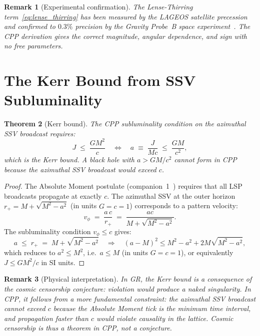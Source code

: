 \documentclass[12pt]{article}
\newtheorem{theorem}{Theorem}[section]
\newtheorem{remark}[theorem]{Remark}
\newcommand{\rplus}{r_+}
\begin{document}
\begin{remark}[Experimental confirmation]
The Lense-Thirring term~\eqref{eq:lense_thirring} has been measured
by the LAGEOS satellite precession~\cite{ciufolini1995} and confirmed
to $0.3\%$ precision by the Gravity Probe~B space
experiment~\cite{everitt2011}.  The CPP derivation gives the correct
magnitude, angular dependence, and sign with no free parameters.
\end{remark}

\section{The Kerr Bound from SSV Subluminality}
\label{sec:kerr_bound}

\begin{theorem}[Kerr bound]
\label{thm:kerr_bound}
The CPP subluminality condition on the azimuthal SSV broadcast requires:
\begin{equation}
  J \;\leq\; \frac{GM^2}{c}
  \quad\Longleftrightarrow\quad
  a \;\equiv\; \frac{J}{Mc} \;\leq\; \frac{GM}{c^2},
  \label{eq:kerr_bound}
\end{equation}
which is the Kerr bound.  A black hole with $a > GM/c^2$ cannot form
in CPP because the azimuthal SSV broadcast would exceed $c$.
\end{theorem}

\begin{proof}
The Absolute Moment postulate (companion~1~\cite{c1}) requires that all
LSP broadcasts propagate at exactly $c$.  The azimuthal SSV at the
outer horizon $\rplus = M + \sqrt{M^2 - a^2}$ (in units $G=c=1$)
corresponds to a pattern velocity:
\begin{equation}
  v_\phi \;=\; \frac{a\,c}{\rplus}
  \;=\; \frac{ac}{M + \sqrt{M^2-a^2}}.
  \label{eq:v_phi}
\end{equation}
The subluminality condition $v_\phi \leq c$ gives:
\begin{equation}
  a \;\leq\; \rplus \;=\; M + \sqrt{M^2-a^2}
  \quad\Longrightarrow\quad
  (a-M)^2 \leq M^2 - a^2 + 2M\sqrt{M^2-a^2},
\end{equation}
which reduces to $a^2 \leq M^2$, i.e.\ $a \leq M$ (in units $G=c=1$),
or equivalently $J \leq GM^2/c$ in SI units.
\end{proof}

\begin{remark}[Physical interpretation]
In GR, the Kerr bound is a consequence of the cosmic censorship
conjecture: violation would produce a naked singularity.  In CPP,
it follows from a more fundamental constraint: the azimuthal SSV
broadcast cannot exceed $c$ because the Absolute Moment tick is the
minimum time interval, and propagation faster than $c$ would violate
causality in the lattice.  Cosmic censorship is thus a \emph{theorem}
in CPP, not a conjecture.
\end{remark}
\end{document}
